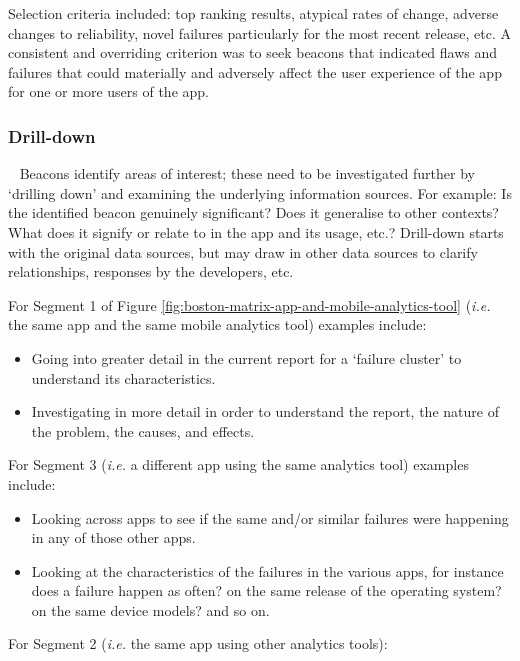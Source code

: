 Selection criteria included: top ranking results, atypical rates of change, adverse changes to reliability, novel failures particularly for the most recent release, etc. A consistent and overriding criterion was to seek beacons that indicated flaws and failures that could materially and adversely affect the user experience of the app for one or more users of the app.

\subsubsection{Drill-down}~\label{drill-down-research-method}
Beacons identify areas of interest; these need to be investigated further by `drilling down' and examining the underlying information sources. For example:  Is the identified beacon genuinely significant? Does it generalise to other contexts?  What does it signify or relate to in the app and its usage, etc.?  Drill-down starts with the original data sources, but may draw in other data sources to clarify relationships, responses by the developers, etc. 

For Segment 1 of Figure \ref{fig:boston-matrix-app-and-mobile-analytics-tool} (\emph{i.e.} the same app and the same mobile analytics tool) examples include:

\begin{itemize}
    \itemsep0em
    \item Going into greater detail in the current report for a `failure cluster' to understand its characteristics.
    \item  Investigating in more detail in order to understand the report, the nature of the problem, the causes, and effects. 
\end{itemize}

For Segment 3 (\emph{i.e.} a different app using the same analytics tool) examples include: 

\begin{itemize}
    \item Looking across apps to see if the same and/or similar failures were happening in any of those other apps.
    \item Looking at the characteristics of the failures in the various apps, for instance does a failure happen as often? on the same release of the operating system? on the same device models? and so on.
\end{itemize}

For Segment 2 (\emph{i.e.} the same app using other analytics tools):

